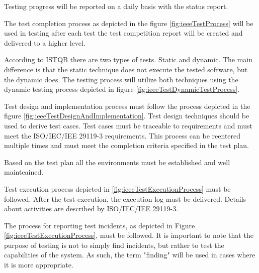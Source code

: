 Testing progress will be reported on a daily basis with the status report.

The test completion process as depicted in the figure \ref{fig:ieeeTestProcess} will be used in testing after each test the test competition report will be created and delivered to a higher level.


According to ISTQB \cite{FoundationOfSoftwareTesting} there are two types of tests. Static and dynamic. The main difference is that the static technique does not execute the tested software, but the dynamic does. The testing process will utilize both techniques using the dynamic testing process depicted in figure \ref{fig:ieeeTestDynamicTestProcess}.


Test design and implementation process must follow the process depicted in the figure \ref{fig:ieeeTestDesignAndImplementation}. Test design techniques should be used to derive test cases. Test cases must be traceable to requirements and must meet the ISO/IEC/IEE 29119-3 requirements. This process can be reentered multiple times and must meet the completion criteria specified in the test plan.


Based on the test plan all the environments must be established and well mainteained.

Test execution process depicted in \ref{fig:ieeeTestExecutionProcess} must be followed. After the test execution, the execution log must be delivered. Details about activities are described by ISO/IEC/IEE 29119-3.


The process for reporting test incidents, as depicted in Figure \ref{fig:ieeeTestExecutionProcess}, must be followed. It is important to note that the purpose of testing is not to simply find incidents, but rather to test the capabilities of the system. As such, the term "finding" will be used in cases where it is more appropriate.

